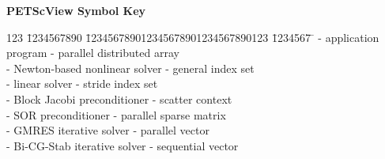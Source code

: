 \pagestyle{empty}
\textwidth 6.8in
\hoffset=-1.0cm
\def\pagewidth{6.8in}


\begin{center}
{\large \bf
PETScView Symbol Key
}
\end{center}
\vspace{-0.3cm}

\begin{tabbing}
123 \= 1234567890 \= 123456789012345678901234567890123 \= 1234567 \= \kill
\>  \> - application program
\>  \> - parallel distributed array\\

\>  \> - Newton-based nonlinear solver
\>  \> - general index set\\

\>  \> - linear solver
\>  \> - stride index set\\

\>  \> - Block Jacobi preconditioner
\>  \> - scatter context\\

\>  \> - SOR preconditioner
\>  \> - parallel sparse matrix\\

\>  \> - GMRES iterative solver
\>  \> - parallel vector\\

\>  \> - Bi-CG-Stab iterative solver
\>  \> - sequential vector\\
\end{tabbing}


